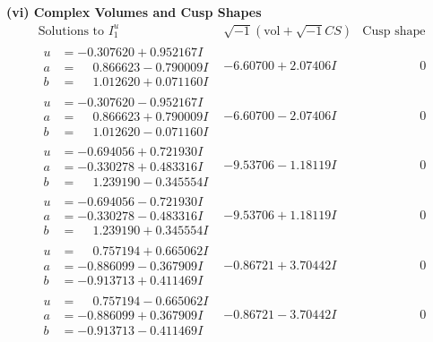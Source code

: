 \documentclass[1p]{elsarticle_modified}
\theoremstyle{definition}
\newcommand{\I}{\sqrt{-1}}
\begin{document}
\newpage\flushleft \textbf{(vi) Complex Volumes and Cusp Shapes}
$$\begin{array}{c|c|c}  
\text{Solutions to }I^u_{1}& \I (\text{vol} + \sqrt{-1}CS) & \text{Cusp shape}\\
 \hline 
\begin{aligned}
u &= -0.307620 + 0.952167 I \\
a &= \phantom{-}0.866623 - 0.790009 I \\
b &= \phantom{-}1.012620 + 0.071160 I\end{aligned}
 & -6.60700 + 2.07406 I & \phantom{-0.000000 } 0 \\ \hline\begin{aligned}
u &= -0.307620 - 0.952167 I \\
a &= \phantom{-}0.866623 + 0.790009 I \\
b &= \phantom{-}1.012620 - 0.071160 I\end{aligned}
 & -6.60700 - 2.07406 I & \phantom{-0.000000 } 0 \\ \hline\begin{aligned}
u &= -0.694056 + 0.721930 I \\
a &= -0.330278 + 0.483316 I \\
b &= \phantom{-}1.239190 - 0.345554 I\end{aligned}
 & -9.53706 - 1.18119 I & \phantom{-0.000000 } 0 \\ \hline\begin{aligned}
u &= -0.694056 - 0.721930 I \\
a &= -0.330278 - 0.483316 I \\
b &= \phantom{-}1.239190 + 0.345554 I\end{aligned}
 & -9.53706 + 1.18119 I & \phantom{-0.000000 } 0 \\ \hline\begin{aligned}
u &= \phantom{-}0.757194 + 0.665062 I \\
a &= -0.886099 - 0.367909 I \\
b &= -0.913713 + 0.411469 I\end{aligned}
 & -0.86721 + 3.70442 I & \phantom{-0.000000 } 0 \\ \hline\begin{aligned}
u &= \phantom{-}0.757194 - 0.665062 I \\
a &= -0.886099 + 0.367909 I \\
b &= -0.913713 - 0.411469 I\end{aligned}
 & -0.86721 - 3.70442 I & \phantom{-0.000000 } 0 \\ \hline\begin{aligned}

\end{aligned}
\end{array}$$
\end{document}
